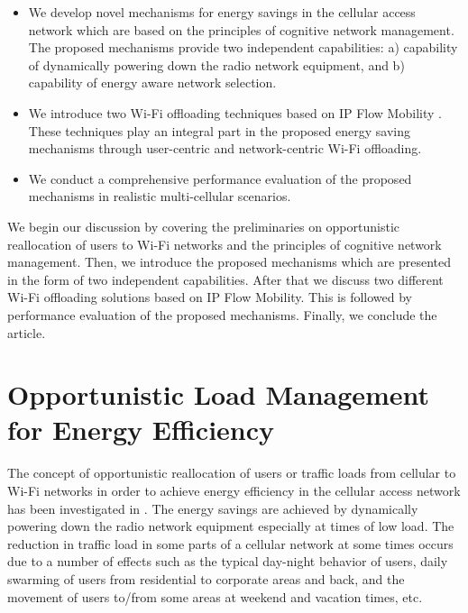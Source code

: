 \documentclass[journal]{IEEEtran}
\begin{document}
\begin{itemize}
\item We develop novel mechanisms for energy savings in the cellular access network which are based on the principles of cognitive network management. The proposed mechanisms provide two independent capabilities: a) capability of dynamically powering down the radio network equipment,  and b) capability of energy aware network selection. 

\item We introduce two Wi-Fi offloading techniques based on IP Flow Mobility \cite{IFOM}. These techniques play an integral part in the proposed energy saving mechanisms through user-centric and network-centric Wi-Fi offloading. 

\item We conduct a comprehensive performance evaluation of the proposed mechanisms in realistic multi-cellular scenarios. 
\end{itemize}



We begin our discussion by covering the preliminaries on opportunistic reallocation of users  to Wi-Fi networks and the principles of cognitive network management. Then, we introduce the proposed mechanisms which are presented in the form of two independent capabilities. After that we discuss two different Wi-Fi offloading solutions based on IP Flow Mobility. This is followed by performance evaluation of the proposed mechanisms. Finally, we conclude the article. 






\section{Opportunistic Load Management for Energy Efficiency}
The concept of opportunistic reallocation of users or traffic loads from cellular to Wi-Fi networks in order to achieve energy efficiency in the cellular access network has been investigated in  \cite{aijaz_icc_12}. The energy savings are achieved by dynamically powering down the radio network equipment especially at times of low load. The reduction in traffic load in some parts of a cellular network at some times occurs due to a number of effects such as the typical day-night behavior of users, daily swarming of users from residential to corporate areas and back, and the movement of users to/from some areas at weekend and vacation times, etc. 
\end{document}
